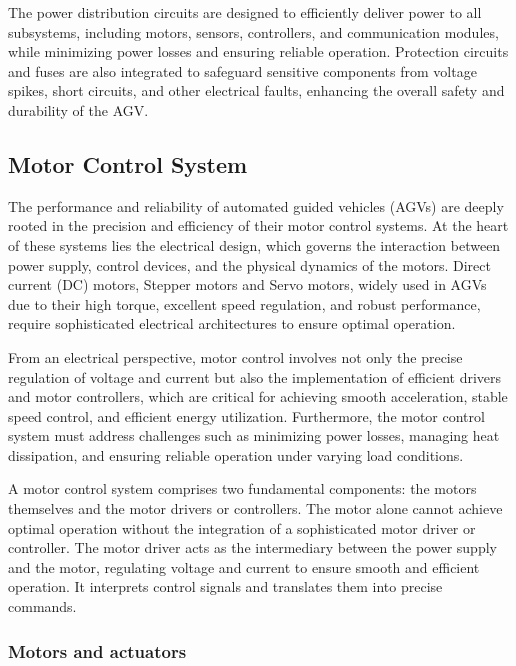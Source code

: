 \documentclass[../../main]{subfiles}
\begin{document}
\newpage

The power distribution circuits are designed to efficiently deliver power to all 
subsystems, including motors, sensors, controllers, and communication 
modules, while minimizing power losses and ensuring reliable operation. 
Protection circuits and fuses are also integrated to safeguard sensitive 
components from voltage spikes, short circuits, and other electrical faults, 
enhancing the overall safety and durability of the AGV.

\subsection{Motor Control System}

The performance and reliability of automated guided vehicles (AGVs) are deeply rooted in the precision and efficiency of
their motor control systems\cite{cservenak2018further}. At the heart of these systems lies the electrical design, which governs the interaction 
between power supply, control devices, and the physical dynamics of the motors. Direct current (DC) motors\cite{OrientalMotorAGV}, Stepper motors\cite{LinEngineering_AGV} and Servo motors\cite{AMC_AGV_Benefits}, widely 
used in AGVs due to their high torque, excellent speed regulation, and robust performance, require sophisticated electrical 
architectures to ensure optimal operation. 

From an electrical perspective, motor control involves not only the precise regulation of voltage and current but 
also the implementation of efficient drivers and motor controllers, which are critical for achieving smooth acceleration, 
stable speed control, and efficient energy utilization. Furthermore, the motor control system must address challenges 
such as minimizing power losses, managing heat dissipation, and ensuring reliable operation under varying load conditions. 

A motor control system comprises two fundamental components: the motors themselves and the motor drivers or controllers. 
The motor alone cannot achieve optimal operation without the integration of a sophisticated motor driver or controller. 
The motor driver acts as the intermediary between the power supply and the motor, regulating voltage and current to ensure 
smooth and efficient operation. It interprets control signals and translates them into precise commands.

\subsubsection{Motors and actuators}
\end{document}
